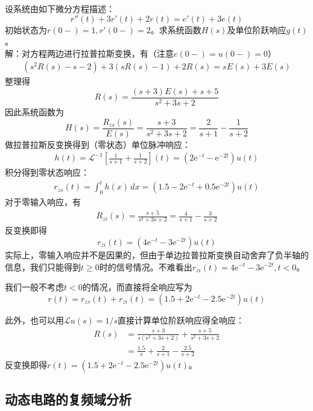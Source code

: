 \documentclass{ctexbook}
\begin{document}
\begin{example}[常系数线性微分方程]
    设系统由如下微分方程描述：
    \[r''(t)+3r'(t)+2r(t)=e'(t)+3e(t)\]
    初始状态为$r(0-)=1,r'(0-)=2$。求系统函数$H(s)$及单位阶跃响应$g(t)$。\\
    解：对方程两边进行拉普拉斯变换，有（注意$e(0-)=u(0-)=0$）
    \begin{align*}
        \left(s^2 R(s)-s-2\right)+3\left(s R(s)-1\right)+2 R(s)=sE(s)+3E(s)
    \end{align*}
    整理得
    \[R(s)=\frac{(s+3)E(s)+s+5}{s^2+3s+2}\]
    因此系统函数为
    \[H(s)=\frac{R_{zs}(s)}{E(s)}=\frac{s+3}{s^2+3s+2}=\frac{2}{s+1}-\frac{1}{s+2}\]
    做拉普拉斯反变换得到（零状态）单位脉冲响应：
    \begin{align*}
        h(t)=\mathcal{L}^{-1} \left[\frac{1}{s+1}+\frac{1}{s+2}\right](t)=(2\mathrm{e}^{-t}-\mathrm{e}^{-2t})u(t)
    \end{align*}
    积分得到零状态响应：
    \begin{align*}
    r_{zs}(t)=\int_0^{t}h(x)\,dx=(1.5-2\mathrm{e}^{-t}+0.5\mathrm{e}^{-2t})u(t)
    \end{align*}
    对于零输入响应，有
    \begin{align*}
        R_{zi}(s)=\frac{s+5}{s^2+3s+2}=\frac{4}{s+1}-\frac{3}{s+2}
    \end{align*}
    反变换即得$$r_{zi}(t)=(4\mathrm{e}^{-t}-3\mathrm{e}^{-2t})u(t)$$
    实际上，零输入响应并不是因果的，但由于单边拉普拉斯变换自动舍弃了负半轴的信息，我们只能得到$t\geq 0$时的信号情况。不难看出$r_{zi}(t)=4\mathrm{e}^{-t}-3\mathrm{e}^{-2t},t<0$。

    我们一般不考虑$t<0$的情况，而直接将全响应写为
    $$r(t)=r_{zs}(t)+r_{zi}(t)=(1.5+2\mathrm{e}^{-t}-2.5\mathrm{e}^{-2t})u(t)$$

    此外，也可以用$\mathcal{L} u(s)=1/s$直接计算单位阶跃响应得全响应：
    \begin{align*}
        R(s)&=\frac{s+3}{s(s^2+3s+2)}+\frac{s+5}{s^2+3s+2}\\
        &=\frac{1.5}{s}+\frac{2}{s+1}-\frac{2.5}{s+2}
    \end{align*}
    反变换即得$r(t)=(1.5+2\mathrm{e}^{-t}-2.5\mathrm{e}^{-2t})u(t)$。
\end{example}

\subsection{动态电路的复频域分析}\label{sub:laplace_circuit}
\end{document}
